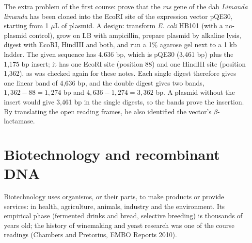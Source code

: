 \begin{example}
\label{example-mcb-pqe30}
The extra problem of the first course: prove
that the \emph{ras} gene of the dab
\emph{Limanda limanda} has been cloned into
the EcoRI site of the expression vector
pQE30, starting from 1 $\mu$L of plasmid.
A design: transform \emph{E. coli}
HB101 (with a no-plasmid control), grow on LB
with ampicillin, prepare plasmid by alkaline
lysis, digest with EcoRI, HindIII and both,
and run a 1\% agarose gel next to a 1 kb
ladder. The given sequence has 4,636 bp,
which is pQE30 (3,461 bp) plus the 1,175 bp
insert; it has one EcoRI site (position 88)
and one HindIII site (position 1,362), as was
checked again for these notes. Each single
digest therefore gives one linear band of
4,636 bp, and the double digest gives two
bands, $1,362 - 88 = 1,274$ bp and $4,636 -
1,274 = 3,362$ bp. A plasmid without the
insert would give 3,461 bp in the single
digests, so the bands prove the insertion. By
translating the open reading frames, he also
identified the vector's $\beta$-lactamase.
\end{example}

\section{Biotechnology and recombinant DNA}
\label{section-mcb-biotechnology}

Biotechnology uses organisms, or their parts,
to make products or provide services: in
health, agriculture, animals, industry and
the environment. Its empirical phase
(fermented drinks and bread, selective
breeding) is thousands of years old; the
history of winemaking and yeast research was
one of the course readings (Chambers and
Pretorius, EMBO Reports 2010).

